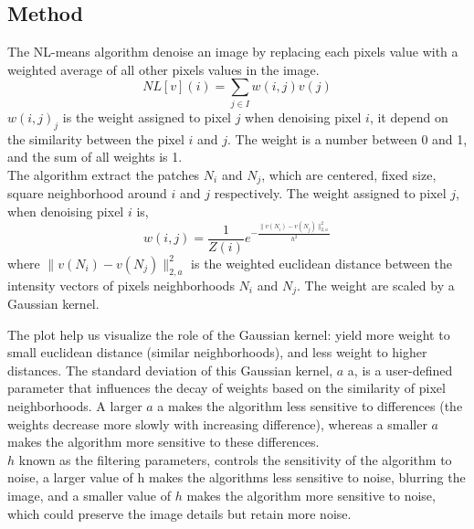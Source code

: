 \documentclass[a4paper, twocolumn, twoside]{article}
\begin{document}
\subsection{Method}
The NL-means algorithm denoise an image by replacing each pixels value with a weighted average of all other pixels values in the image.
$$
NL[v](i) = \sum_{j \in I} w(i,j)v(j)
$$
${w(i,j)}_j$ is the weight assigned to pixel $j$ when denoising pixel $i$, it depend on the similarity between the pixel $i$ and $j$.
The weight is a number between 0 and 1, and the sum of all weights is 1.\\
The algorithm extract the patches $N_i$ and $N_j$, which are
centered, fixed size, square neighborhood around $i$ and $j$ respectively.
The weight assigned to pixel $j$, when denoising pixel $i$ is,
$$
w(i,j) = \frac{1}{Z(i)}e^{-\frac{\|v(N_i) - v(N_j)\|_{2,a}^2}{h^2}}
$$
where $\|v(N_i) - v(N_j)\|_{2,a}^2$ is the weighted euclidean distance between the
intensity vectors of pixels neighborhoods $N_i$ and $N_j$. The weight are scaled by a Gaussian kernel.\\
\begin{figure}[H]
	\centering
\end{figure}
The plot help us visualize the role of the Gaussian kernel: yield more weight to small euclidean distance (similar neighborhoods),
and less weight to higher distances.
The standard deviation of this Gaussian kernel, $a$
a, is a user-defined parameter that influences the decay of weights based on the similarity of pixel neighborhoods. A larger $a$
a makes the algorithm less sensitive to differences (the weights decrease more slowly with increasing difference), whereas a smaller 
$a$ makes the algorithm more sensitive to these differences.\\
$h$ known as the filtering parameters, controls the sensitivity of the algorithm to noise, a larger 
value of h makes the algorithms less sensitive to noise, blurring the image, and a smaller value of $h$ makes the algorithm more sensitive
to noise, which could preserve the image details but retain more noise.\\
\end{document}

